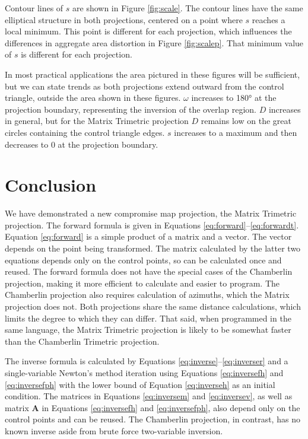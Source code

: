\documentclass[]{interact}
\begin{document}
Contour lines of $s$ are shown in Figure \ref{fig:scale}.
The contour lines have the same elliptical structure in both projections,
centered on a point where $s$ reaches a local minimum.
This point is different for each projection, which influences
the differences in aggregate area distortion in Figure \ref{fig:scalep}.
That minimum value of $s$ is different for each projection.

In most practical applications the area pictured in these figures will be
sufficient, but we can state trends as both projections extend outward from the
control triangle, outside the area shown in these figures. $\omega$ increases to
180° at the projection boundary, representing the inversion of the overlap region. $D$
increases in general, but for the Matrix Trimetric projection
$D$ remains low on the great circles containing the control triangle edges.
$s$ increases to a maximum and then decreases to 0 at the projection boundary.

\section{Conclusion}
We have demonstrated a new compromise map projection, the Matrix Trimetric
projection. The forward formula is given in Equations
\ref{eq:forward}--\ref{eq:forwardt}. Equation \ref{eq:forward} is a simple
product of a matrix and a vector. The vector depends on the point being
transformed. The matrix calculated by the latter two equations depends only on
the control points, so can be calculated once and reused. The forward formula
does not have the special cases of the Chamberlin projection, making it more
efficient to calculate and easier to program. The Chamberlin projection also
requires calculation of azimuths, which the Matrix projection does not. Both
projections share the same distance calculations,
which limits the degree to which they can differ. That
said, when programmed in the same language, the Matrix Trimetric projection
is likely to be somewhat faster than the Chamberlin Trimetric projection.

The inverse formula is calculated by Equations
\ref{eq:inverse}--\ref{eq:inverser} and a single-variable
Newton's method iteration using Equations \ref{eq:inversefh} and
\ref{eq:inversefph} with the lower bound of Equation \ref{eq:inverseh} as an
initial condition. The matrices in Equations \ref{eq:inversem} and
\ref{eq:inversev}, as well as
matrix $\mathbf A$ in Equations \ref{eq:inversefh} and \ref{eq:inversefph}, also
depend only on the control points and can be reused. The Chamberlin projection,
in contrast, has no known inverse aside from brute force two-variable inversion.
\end{document}
